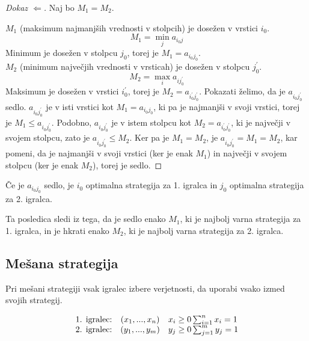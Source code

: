 \documentclass[11pt, a4paper]{article}
\begin{document}
    \begin{proof}[Dokaz \(\Longleftarrow\)]
        Naj bo \(M_1 = M_2\). 
        \par
        \(M_1\) (maksimum najmanjših vrednosti v stolpcih) je dosežen v vrstici \(i_0\).
        \[
            M_1 = \min_j a_{i_0 j}    
        \]
        Minimum je dosežen v stolpcu \(j_0\), torej je \(M_1 = a_{i_0 j_0}\). \\
        
        \(M_2\) (minimum največjih vrednosti v vrsticah) je dosežen v stolpcu \(j_0^\prime\).
        \[
            M_2 = \max_i a_{i j_0^\prime}   
        \]
        Maksimum je dosežen v vrstici \(i_0^\prime\), torej je \(M_2 = a_{i_0^\prime j_0^\prime}\). Pokazati želimo, da je \(a_{i_0 j_0^\prime}\) sedlo. \(a_{i_0 j_0^\prime}\) je v isti vrstici kot \(M_1 = a_{i_0 j_0}\), ki pa je najmanjši v svoji vrstici, torej je \(M_1 \le a_{i_0 j_0^\prime}\). Podobno, \(a_{i_0 j_0^\prime}\) je v istem stolpcu kot \(M_2 = a_{i_0^\prime j_0^\prime}\), ki je največji v svojem stolpcu, zato je \(a_{i_0 j_0^\prime} \le M_2\). Ker pa je \(M_1 = M_2\), je \(a_{i_0 j_0^\prime} = M_1 = M_2\), kar pomeni, da je najmanjši v svoji vrstici (ker je enak \(M_1\)) in največji v svojem stolpcu (ker je enak \(M_2\)), torej je sedlo.
    \end{proof}

    \begin{corollary}
        Če je \(a_{i_0 j_0}\) sedlo, je \(i_0\) optimalna strategija za 1. igralca in \(j_0\) optimalna strategija za 2. igralca.
    \end{corollary}

    Ta posledica sledi iz tega, da je sedlo enako \(M_1\), ki je najbolj varna strategija za 1. igralca, in je hkrati enako \(M_2\), ki je najbolj varna strategija za 2. igralca.

    \subsection{Mešana strategija}

    Pri mešani strategiji vsak igralec izbere verjetnosti, da uporabi vsako izmed svojih strategij.

    \[
        \begin{array}{l c l r}
            \text{1. igralec:} & (x_1,...,x_n) & x_i \ge 0 \sum_{i=1}^n x_i = 1 \\
            \text{2. igralec:} & (y_1,...,y_m) & y_j \ge 0 \sum_{j=1}^m y_j = 1 \\
        \end{array}    
    \]
\end{document}
